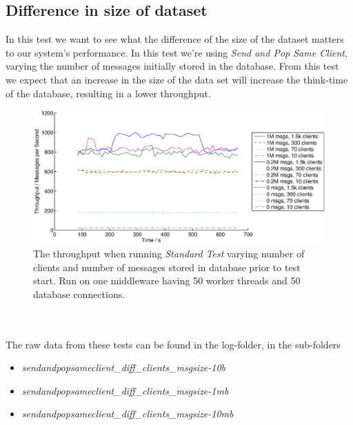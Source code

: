 \documentclass{article}
\begin{document}
        \subsection{Difference in size of dataset}
            \label{sec:difference_in_size_of_dataset}
            In this test we want to see what the difference of the size of the dataset matters to our system's performance. In this test we're using \textit{Send and Pop Same Client}, varying the number of messages initially stored in the database. From this test we expect that an increase in the size of the data set will increase the think-time of the database, resulting in a lower throughput.
            \begin{figure}[H]
                \centerline{\includegraphics[scale=0.55]{msg_db_clients}}
                \caption{The throughput when running \textit{Standard Test} varying number of clients and number of messages stored in database prior to test start. Run on one middleware having 50 worker threads and 50 database connections.}
                \label{fig:msg_db_clients}
            \end{figure}
            ~\\
            \\
            The raw data from these tests can be found in the log-folder, in the sub-folders
            \begin{itemize}
                \item \textit{sendandpopsameclient\_diff\_clients\_msgsize-10b}
                \item \textit{sendandpopsameclient\_diff\_clients\_msgsize-1mb}
                \item \textit{sendandpopsameclient\_diff\_clients\_msgsize-10mb}
            \end{itemize}
\end{document}
